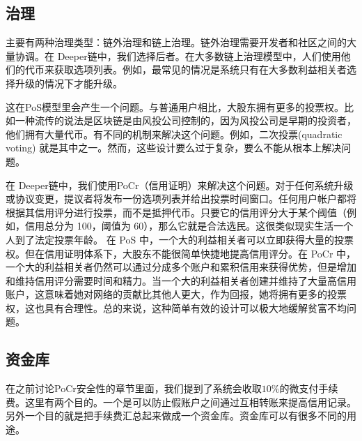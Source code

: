 \documentclass[a4paper]{article}
\begin{document}




\subsection{治理}
主要有两种治理类型：链外治理和链上治理。链外治理需要开发者和社区之间的大量协调。在 Deeper链中，我们选择后者。在大多数链上治理模型中，人们使用他们的代币来获取选项列表。例如，最常见的情况是系统只有在大多数利益相关者选择升级的情况下才能升级。

这在PoS模型里会产生一个问题。与普通用户相比，大股东拥有更多的投票权。比如一种流传的说法是区块链是由风投公司控制的，因为风投公司是早期的投资者，他们拥有大量代币。有不同的机制来解决这个问题。例如，二次投票(quadratic voting) 就是其中之一。然而，这些设计要么过于复杂，要么不能从根本上解决问题。

在 Deeper链中，我们使用PoCr（信用证明）来解决这个问题。对于任何系统升级或协议变更，提议者将发布一份选项列表并给出投票时间窗口。任何用户帐户都将根据其信用评分进行投票，而不是抵押代币。只要它的信用评分大于某个阈值（例如，信用总分为
100，阈值为 60），那么它就是合法选民。这很类似现实生活一个人到了法定投票年龄。
在 PoS 中，一个大的利益相关者可以立即获得大量的投票权。但在信用证明体系下，大股东不能很简单快捷地提高信用评分。在 PoCr 中，一个大的利益相关者仍然可以通过分成多个账户和累积信用来获得优势，但是增加和维持信用评分需要时间和精力。当一个大的利益相关者创建并维持了大量高信用账户，这意味着她对网络的贡献比其他人更大，作为回报，她将拥有更多的投票权，这也具有合理性。总的来说，这种简单有效的设计可以极大地缓解贫富不均问题。


\subsection{资金库}
在之前讨论PoCr安全性的章节里面，我们提到了系统会收取$10\%$的微支付手续费。这里有两个目的。一个是可以防止假账户之间通过互相转账来提高信用记录。另外一个目的就是把手续费汇总起来做成一个资金库。资金库可以有很多不同的用途。
\end{document}
